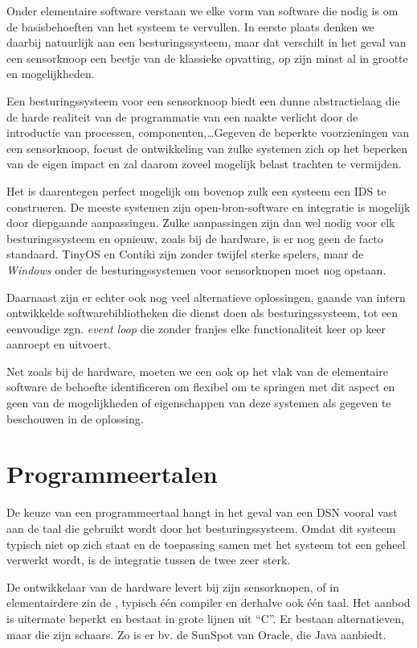 Onder elementaire software verstaan we elke vorm van software die nodig is om
de basisbehoeften van het systeem te vervullen. In eerste plaats denken we
daarbij natuurlijk aan een besturingssysteem, maar dat verschilt in het geval
van een sensorknoop een beetje van de klassieke opvatting, op zijn minst al in
grootte en mogelijkheden.

Een besturingssysteem voor een sensorknoop biedt een dunne abstractielaag die
de harde realiteit van de programmatie van een naakte \mcu verlicht door de
introductie van processen, componenten,\dots Gegeven de beperkte voorzieningen
van een sensorknoop, focust de ontwikkeling van zulke systemen zich op het
beperken van de eigen impact en zal daarom zoveel mogelijk belast trachten te
vermijden.

Het is daarentegen perfect mogelijk om bovenop zulk een systeem een IDS te
construeren. De meeste systemen zijn open-bron-software en integratie is
mogelijk door diepgaande aanpassingen. Zulke aanpassingen zijn dan wel nodig
voor elk besturingssysteem en opnieuw, zoals bij de hardware, is er nog geen de
facto standaard. TinyOS en Contiki zijn zonder twijfel sterke spelers, maar de
\emph{Windows} onder de besturingssystemen voor sensorknopen moet nog opstaan.

Daarnaast zijn er echter ook nog veel alternatieve oplossingen, gaande van
intern ontwikkelde softwarebibliotheken die dienst doen als besturingssysteem,
tot een eenvoudige zgn. \emph{event loop} die zonder franjes elke
functionaliteit keer op keer aanroept en uitvoert.

Net zoals bij de hardware, moeten we een ook op het vlak van de elementaire
software de behoefte identificeren om flexibel om te springen met dit aspect en
geen van de mogelijkheden of eigenschappen van deze systemen als gegeven te
beschouwen in de oplossing.

\section{Programmeertalen}
\label{section:solution-proglang}

De keuze van een programmeertaal hangt in het geval van een DSN vooral vast aan
de taal die gebruikt wordt door het besturingssysteem. Omdat dit systeem
typisch niet op zich staat en de toepassing samen met het systeem tot een
geheel verwerkt wordt, is de integratie tussen de twee zeer sterk.

De ontwikkelaar van de hardware levert bij zijn sensorknopen, of in
elementairdere zin de \mcu, typisch \'e\'en compiler en derhalve ook \'e\'en
taal. Het aanbod is uitermate beperkt en bestaat in grote lijnen uit ``C''. Er
bestaan alternatieven, maar die zijn schaars. Zo is er bv. de SunSpot van
Oracle, die Java aanbiedt.

